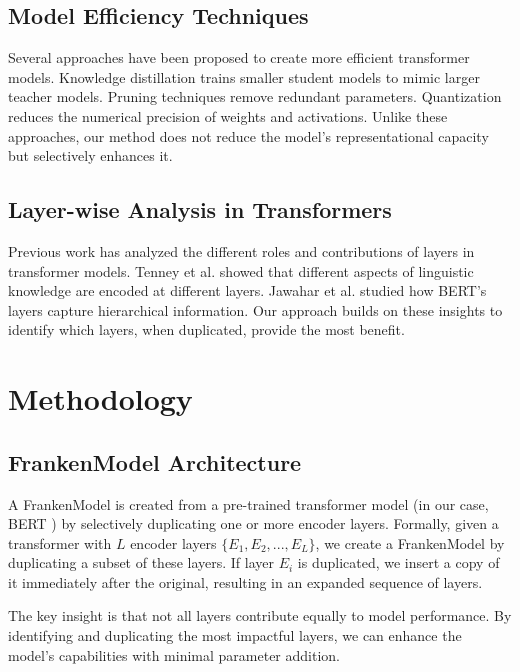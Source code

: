 \documentclass[conference]{IEEEtran}
\begin{document}
\subsection{Model Efficiency Techniques}
Several approaches have been proposed to create more efficient transformer models. Knowledge distillation \cite{hinton2015distilling} trains smaller student models to mimic larger teacher models. Pruning techniques \cite{frankle2018lottery} remove redundant parameters. Quantization \cite{zafrir2019q8bert} reduces the numerical precision of weights and activations. Unlike these approaches, our method does not reduce the model's representational capacity but selectively enhances it.

\subsection{Layer-wise Analysis in Transformers}
Previous work has analyzed the different roles and contributions of layers in transformer models. Tenney et al. \cite{tenney2019bert} showed that different aspects of linguistic knowledge are encoded at different layers. Jawahar et al. \cite{jawahar2019does} studied how BERT's layers capture hierarchical information. Our approach builds on these insights to identify which layers, when duplicated, provide the most benefit.

\section{Methodology}

\subsection{FrankenModel Architecture}
A FrankenModel is created from a pre-trained transformer model (in our case, BERT \cite{devlin2019bert}) by selectively duplicating one or more encoder layers. Formally, given a transformer with $L$ encoder layers $\{E_1, E_2, ..., E_L\}$, we create a FrankenModel by duplicating a subset of these layers. If layer $E_i$ is duplicated, we insert a copy of it immediately after the original, resulting in an expanded sequence of layers.

The key insight is that not all layers contribute equally to model performance. By identifying and duplicating the most impactful layers, we can enhance the model's capabilities with minimal parameter addition.
\end{document}
